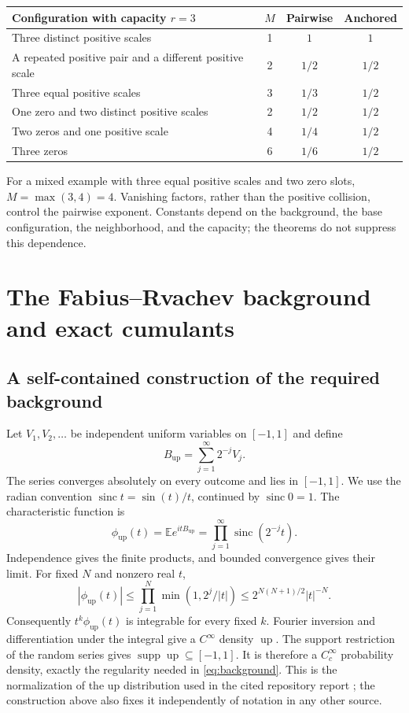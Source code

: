 \documentclass[11pt,a4paper]{article}
\numberwithin{equation}{section}
\theoremstyle{definition}
\theoremstyle{remark}
\newcommand{\E}{\mathbb E}
\newcommand{\up}{\operatorname{up}}
\newcommand{\sinc}{\operatorname{sinc}}
\newcommand{\supp}{\operatorname{supp}}
\begin{document}
\begin{center}
\begin{tabular}{@{}p{}ccc@{}}
\toprule
Configuration with capacity $r=3$ & $M$ & Pairwise & Anchored\\
\midrule
Three distinct positive scales & 1 & $1$ & $1$\\
A repeated positive pair and a different positive scale & 2 & $1/2$ & $1/2$\\
Three equal positive scales & 3 & $1/3$ & $1/2$\\
One zero and two distinct positive scales & 2 & $1/2$ & $1/2$\\
Two zeros and one positive scale & 4 & $1/4$ & $1/2$\\
Three zeros & 6 & $1/6$ & $1/2$\\
\bottomrule
\end{tabular}
\end{center}
For a mixed example with three equal positive scales and two zero slots,
$M=\max(3,4)=4$.  Vanishing factors, rather than the positive collision, control
the pairwise exponent.  Constants depend on the background, the base
configuration, the neighborhood, and the capacity; the theorems do not suppress
this dependence.

\section{The Fabius--Rvachev background and exact cumulants}
\label{sec:fabius}

\subsection{A self-contained construction of the required background}
Let $V_1,V_2,\ldots$ be independent uniform variables on $[-1,1]$ and define
\begin{equation}
 B_{\up}=\sum_{j=1}^{\infty}2^{-j}V_j.
 \label{eq:up-series}
\end{equation}
The series converges absolutely on every outcome and lies in $[-1,1]$.  We use
the radian convention $\sinc t=\sin(t)/t$, continued by $\sinc0=1$.
The characteristic function is
\begin{equation}
 \phi_{\up}(t)=\E e^{itB_{\up}}
       =\prod_{j=1}^{\infty}\sinc(2^{-j}t).
 \label{eq:up-product}
\end{equation}
Independence gives the finite products, and bounded convergence gives their limit.
For fixed $N$ and nonzero real $t$,
\begin{equation}
 |\phi_{\up}(t)|\le
 \prod_{j=1}^N\min(1,2^j/|t|)
 \le 2^{N(N+1)/2}|t|^{-N}.
 \label{eq:rapid-decay}
\end{equation}
Consequently $t^k\phi_{\up}(t)$ is integrable for every fixed $k$.  Fourier inversion
and differentiation under the integral give a $C^\infty$ density $\up$.  The
support restriction of the random series gives $\supp\up\subseteq[-1,1]$.
It is therefore a $C_c^\infty$ probability density, exactly the regularity needed
in \eqref{eq:background}.  This is the normalization of the up distribution used
in the cited repository report \cite{RepoHolonomic}; the construction above also
fixes it independently of notation in any other source.
\end{document}
